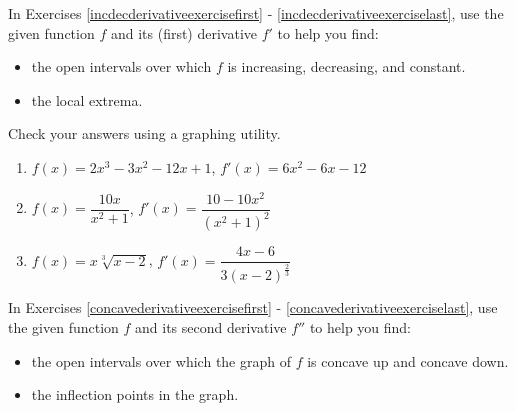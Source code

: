\documentclass{ximera}
\begin{document}
	\author{Stitz-Zeager}


\label{ExercisesforAppDerivatives}


In Exercises \ref{incdecderivativeexercisefirst} - \ref{incdecderivativeexerciselast},  use the given function $f$ and its (first) derivative $f'$ to help you find:

\begin{itemize}

\item the open intervals over which $f$ is increasing, decreasing, and constant.

\item the local extrema.

\end{itemize}

Check your answers using a graphing utility.

\begin{enumerate}

\item\label{incdecderivativeexercisefirst} $f(x) = 2x^{3}-3x^{2}-12x + 1$, $f'(x) = 6x^2-6x-12$ %

\smallskip

\item $f(x) = \dfrac{10x}{x^2+1}$, $f'(x) = \dfrac{10-10x^2}{\left(x^2+1\right)^2}$ %

\smallskip

\item\label{incdecderivativeexerciselast} $f(x) = x \sqrt[3]{x-2}$, $f'(x)=\dfrac{4x-6}{3(x-2)^{\frac{2}{3}}}$ %

\smallskip

\setcounter{HW}{\value{enumi}}
\end{enumerate}

In Exercises \ref{concavederivativeexercisefirst} - \ref{concavederivativeexerciselast},  use the given function $f$ and its second derivative $f''$ to help you find:

\begin{itemize}

\item  the open intervals over which the graph of $f$ is concave up and concave down.

\item  the inflection points in the graph.

\end{itemize}
\end{document}
